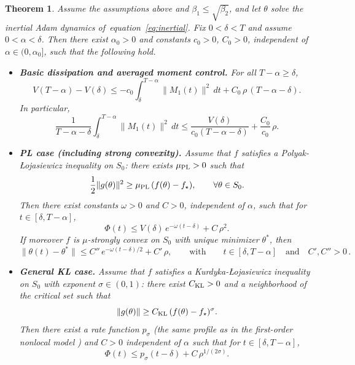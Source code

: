 \documentclass{article} %
\def\eqref#1{equation~\ref{#1}}
\newtheorem{theorem}{Theorem}
\begin{document}
\begin{theorem}\label{thm:robust-inertial-adam}
Assume the assumptions above and $\beta_1 \leq \sqrt{\beta_2}$, and let $\theta$ solve the inertial Adam dynamics of~\eqref{eq:inertial}. Fix $0<\delta<T$ and assume $0<\alpha<\delta$. Then there exist $\alpha_0>0$ and constants $c_0>0$, $C_0>0$, independent of $\alpha\in(0,\alpha_0]$, such that the following hold.

\begin{itemize}
\item \textbf{Basic dissipation and averaged moment control.}
For all $T-\alpha\ge \delta$,
\[
V(T-\alpha) -V(\delta) 
\le
-c_0\int_\delta^{T-\alpha} \|M_1(t)\|^2\,dt+C_0\,\rho\,(T-\alpha-\delta).
\]
In particular,
\[
\frac{1}{T-\alpha-\delta}\int_\delta^{T-\alpha} \|M_1(t)\|^2\,dt
\le \frac{V(\delta)}{c_0 (T-\alpha-\delta)} +  \frac{C_0}{c_0}\,\rho.
\]

\item \textbf{PL case (including strong convexity).}
Assume that $f$ satisfies a Polyak-{\L}ojasiewicz inequality on $S_0$: there exists $\mu_{\rm PL}>0$ such that
\[
\frac12\|g(\theta)\|^2\ge \mu_{\rm PL}\,(f(\theta)-f_\star),
\qquad \forall\theta\in S_0.
\]
Then there exist constants $\omega>0$ and $C>0$, independent of $\alpha$, such that for $t\in[\delta,T-\alpha]$,
\[
\Phi(t)\le V(\delta)\,e^{-\omega (t-\delta)}+C\,\rho^2.
\]
If moreover $f$ is $\mu$-strongly convex on $S_0$ with unique minimizer $\theta^\ast$, then
\[
\|\theta(t)-\theta^\ast\|\le C''\,e^{-\omega (t-\delta)/2} +  C'\,\rho, \qquad \text{with} \qquad t\in[\delta,T-\alpha] \quad \text{and} \quad C', C'' >0\,.
\]

\item \textbf{General KL case.}
Assume that $f$ satisfies a Kurdyka-{\L}ojasiewicz inequality on $S_0$ with exponent $\sigma\in(0,1)$: there exist $C_{\rm KL}>0$ and a neighborhood of the critical set such that
\[
\|g(\theta)\|\ge C_{\rm KL}\,(f(\theta)-f_\star)^\sigma.
\]
Then there exist a rate function $p_\sigma$ (the same profile as in the first-order nonlocal model \cite{heredia2025modelingadagradrmspropadam}) and $C>0$ independent of $\alpha$ such that for $t\in[\delta,T-\alpha]$,
\[
\Phi(t)\le p_\sigma(t-\delta)+C\,\rho^{1/(2\sigma)}.
\]
\end{itemize}
\end{theorem}
\end{document}
